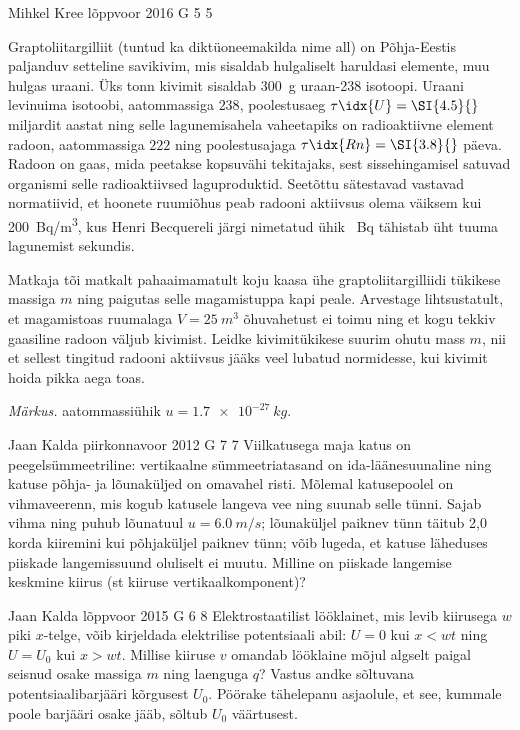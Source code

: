 \documentclass[11pt]{article}
\begin{document}
{%
{Mihkel Kree} %
{lõppvoor} %
{2016} %
{G 5} %
{5} %
{
\ifStatement
Graptoliitargilliit (tuntud ka diktüoneemakilda nime all) on Põhja-Eestis paljanduv setteline savikivim, mis sisaldab hulgaliselt haruldasi elemente, muu hulgas uraani. Üks tonn kivimit sisaldab \SI{300}{g} uraan-238 isotoopi. Uraani levinuima isotoobi, aatommassiga $238$, poolestusaeg $\tau\idx{U}=\SI{4.5}{}$ miljardit aastat ning selle lagunemisahela vaheetapiks on radioaktiivne element radoon, aatommassiga $222$ ning poolestusajaga $\tau\idx{Rn}=\SI{3.8}{}$ päeva. Radoon on gaas, mida peetakse kopsuvähi tekitajaks, sest sissehingamisel satuvad organismi selle radioaktiivsed laguproduktid. Seetõttu sätestavad vastavad normatiivid, et hoonete ruumiõhus peab radooni aktiivsus olema väiksem kui \SI{200}{Bq/m^3}, kus	Henri Becquereli järgi nimetatud ühik \SI{}{Bq} tähistab üht tuuma lagunemist sekundis.

Matkaja tõi matkalt pahaaimamatult koju kaasa ühe graptoliitargilliidi tükikese massiga $m$ ning paigutas selle magamistuppa kapi peale. Arvestage lihtsustatult, et magamistoas ruumalaga $V=\SI{25}{m^3}$ õhuvahetust ei toimu ning et kogu tekkiv gaasiline radoon väljub kivimist. Leidke kivimitükikese suurim ohutu mass $m$, nii et sellest tingitud radooni aktiivsus jääks veel lubatud normidesse, kui kivimit hoida pikka aega toas. 

\emph{Märkus.} aatommassiühik $u=\SI{1.7e-27}{kg}$.
\fi
}

{Jaan Kalda} %
{piirkonnavoor} %
{2012} %
{G 7} %
{7} %
{
\ifStatement
Viilkatusega maja katus on peegelsümmeetriline: vertikaalne sümmeetriatasand on
ida-läänesuunaline ning katuse
põhja- ja lõunaküljed on omavahel risti. Mõlemal katusepoolel on vihmaveerenn,
mis kogub katusele langeva vee ning suunab selle tünni.
Sajab vihma ning puhub lõunatuul $u= \SI{6,0}{m/s}$; lõunaküljel paiknev tünn
täitub 2,0 korda kiiremini kui põhjaküljel paiknev tünn; võib
lugeda, et katuse läheduses piiskade langemissuund oluliselt ei muutu.
Milline on piiskade langemise keskmine kiirus (st kiiruse vertikaalkomponent)?
\fi
}

{Jaan Kalda} %
{lõppvoor} %
{2015} %
{G 6} %
{8} %
{
\ifStatement
Elektrostaatilist lööklainet, mis levib kiirusega $w$ piki $x$-telge, võib kirjeldada elektrilise potentsiaali abil: $U=0$ kui $x<wt$ ning $U=U_0$ kui $x>wt$. Millise kiiruse $v$ omandab lööklaine mõjul algselt paigal seisnud osake massiga $m$ ning laenguga $q$? Vastus andke sõltuvana potentsiaalibarjääri kõrgusest $U_0$. Pöörake tähelepanu asjaolule, et see, kummale poole barjääri osake jääb, sõltub $U_0$ väärtusest. 
\fi
}

}
\end{document}
